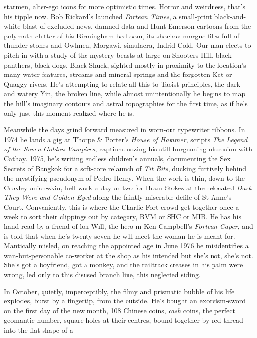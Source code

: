 \documentclass[
]{article}
\begin{document}
starmen, alter-ego icons for more optimistic times. Horror and
weirdness, that's his tipple now. Bob Rickard's launched \emph{Fortean
Times}, a small-print black-and-white blast of excluded news, damned
data and Hunt Emerson cartoons from the polymath clutter of his
Birmingham bedroom, its shoebox morgue files full of thunder-stones and
Owlmen, Morgawi, simulacra, Indrid Cold. Our man elects to pitch in with
a study of the mystery beasts at large on Shooters Hill, black panthers,
black dogs, Black Shuck, sighted mostly in proximity to the location's
many water features, streams and mineral springs and the forgotten Ket
or Quaggy rivers. He's attempting to relate all this to Taoist
principles, the dark and watery Yin, the broken line, while almost
unintentionally he begins to map the hill's imaginary contours and
astral topographies for the first time, as if he's only just this moment
realized where he is. \par
Meanwhile the days grind forward measured in worn-out typewriter
ribbons. In 1974 he lands a gig at Thorpe \& Porter's \emph{House of
Hammer}, scripts \emph{The Legend of the Seven Golden Vampires},
captions oozing his still-burgeoning obsession with Cathay. 1975, he's
writing endless children's annuals, documenting the Sex Secrets of
Bangkok for a soft-core relaunch of \emph{Tit Bits}, ducking furtively
behind the mystifying pseudonym of Pedro Henry. When the work is thin,
down to the Croxley onion-skin, hell work a day or two for Bram Stokes
at the relocated \emph{Dark They Were and Golden Eyed} along the faintly
miserable defile of St Anne's Court. Conveniently, this is where the
Charlie Fort crowd get together once a week to sort their clippings out
by category, BVM or SHC or MIB. He has his hand read by a friend of lon
Will, the hero in Ken Campbell's \emph{Fortean Caper}, and is told that
when he's twenty-seven he will meet the woman he is meant for.
Mantically misled, on reaching the appointed age in June 1976 he
misidentifies a wan-but-personable co-worker at the shop as his intended
but she's not, she's not. She's got a boyfriend, got a monkey, and the
railtrack creases in his palm were wrong, led only to this disused
branch line, this neglected siding. \par
In October, quietly, imperceptibly, the filmy and prismatic bubble
of his life explodes, burst by a fingertip, from the outside. He's
bought an exorcism-sword on the first day of the new month, 108 Chinese
coins, \emph{cash} coins, the perfect geomantic number, square holes at
their centres, bound together by red thread into the flat shape of a
\end{document}
